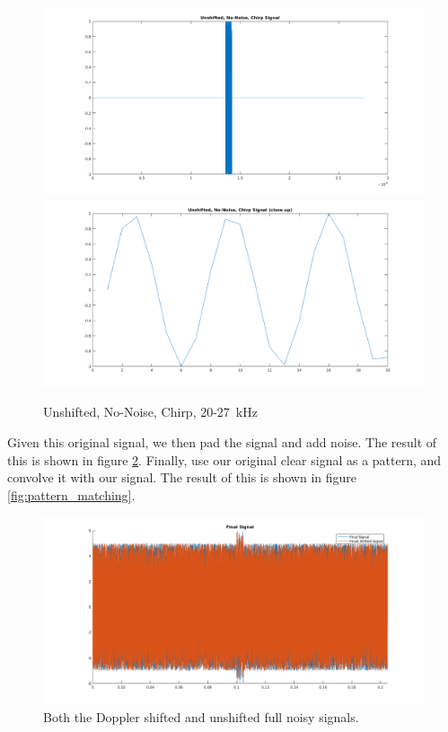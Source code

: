 \documentclass{article}
\begin{document}
    \begin{figure}[H]
      \centering
      \includegraphics[width=1\linewidth]{./images/unshifted_no_noise_chirp.png}
      \includegraphics[width=1\linewidth]{./images/unshifted_no_noise_chirp_zoomed.png}
      \caption{Unshifted, No-Noise, Chirp, 20-27\SI{}{\kilo\hertz}}
      \label{fig:unshifted_no_noise_chirp}
    \end{figure}

    Given this original signal, we then pad the signal and add noise. The result of this is shown in figure \ref{fig:repeated_signal}. Finally, use our original clear signal as a pattern, and convolve it with our signal. The result of this is shown in figure \ref{fig:pattern_matching}.

    \begin{figure}
      \centering
      \includegraphics[width=1\linewidth]{./images/repeated_noisy_signal.png}
      \caption{Both the Doppler shifted and unshifted full noisy signals.}
      \label{fig:repeated_signal}
    \end{figure}
\end{document}
